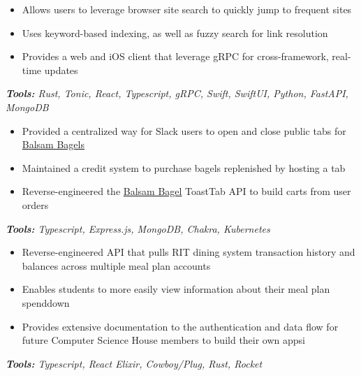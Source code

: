 \begin{itemize}
\item Allows users to leverage browser site search to quickly jump to frequent sites
\item Uses keyword-based indexing, as well as fuzzy search for link resolution
\item Provides a web and iOS client that leverage gRPC for cross-framework, real-time updates
\end{itemize}
\textit{\textbf{Tools:} Rust, Tonic, React, Typescript, gRPC, Swift, SwiftUI, Python, FastAPI, MongoDB}

\divider

\begin{itemize}
\item Provided a centralized way for Slack users to open and close public tabs for \href{https://www.balsambagels.com}{Balsam Bagels}
\item Maintained a credit system to purchase bagels replenished by hosting a tab
\item Reverse-engineered the \href{https://www.balsambagels.com}{Balsam Bagel} ToastTab API to build carts from user orders
\end{itemize}
\textit{\textbf{Tools:} Typescript, Express.js, MongoDB, Chakra, Kubernetes}

\divider

\begin{itemize}
\item Reverse-engineered API that pulls RIT dining system transaction history and balances across multiple meal plan accounts
\item Enables students to more easily view information about their meal plan spenddown
\item Provides extensive documentation to the authentication and data flow for future Computer Science House members to build their own appsi
\end{itemize}
\textit{\textbf{Tools:} Typescript, React Elixir, Cowboy/Plug, Rust, Rocket}